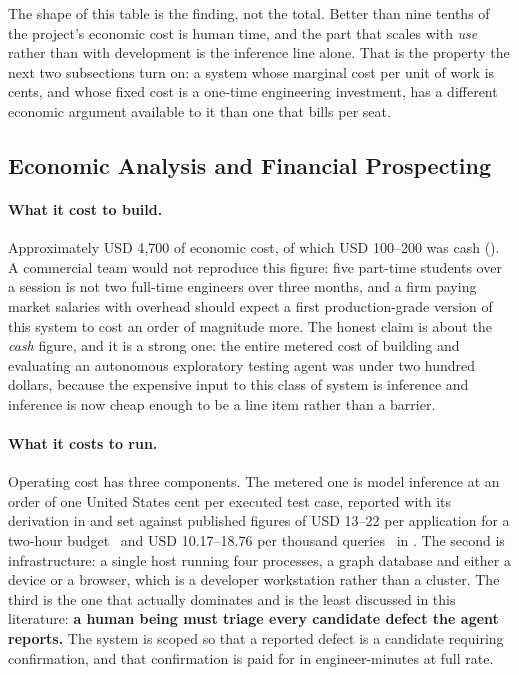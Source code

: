 The shape of this table is the finding, not the total. Better than nine tenths
of the project's economic cost is human time, and the part that scales with
\emph{use} rather than with development is the inference line alone. That is
the property the next two subsections turn on: a system whose marginal cost per
unit of work is cents, and whose fixed cost is a one-time engineering
investment, has a different economic argument available to it than one that
bills per seat.

\subsection{Economic Analysis and Financial Prospecting}
\label{sec:economics}

\paragraph{What it cost to build.} Approximately USD 4{,}700 of economic cost,
of which USD 100--200 was cash (). A commercial team would not
reproduce this figure: five part-time students over a session is not two
full-time engineers over three months, and a firm paying market salaries with
overhead should expect a first production-grade version of this system to cost
an order of magnitude more. The honest claim is about the \emph{cash} figure,
and it is a strong one: the entire metered cost of building and evaluating an
autonomous exploratory testing agent was under two hundred dollars, because the
expensive input to this class of system is inference and inference is now
cheap enough to be a line item rather than a barrier.

\paragraph{What it costs to run.} Operating cost has three components. The
metered one is model inference at an order of one United States cent per
executed test case, reported with its derivation in  and
set against published figures of USD 13--22 per application for a two-hour
budget~\cite{droidagent} and USD 10.17--18.76 per thousand
queries~\cite{autodroid} in . The second is
infrastructure: a single host running four processes, a graph database and
either a device or a browser, which is a developer workstation rather than a
cluster. The third is the one that actually dominates and is the least
discussed in this literature: \textbf{a human being must triage every candidate
defect the agent reports.} The system is scoped so that a reported defect is a
candidate requiring confirmation, and that confirmation is paid for in
engineer-minutes at full rate.

